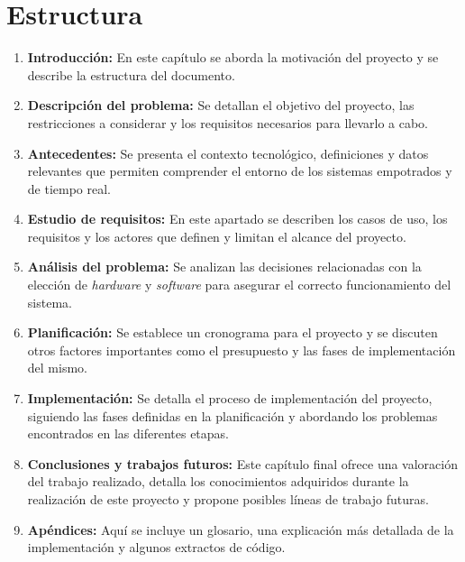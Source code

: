 \section{Estructura}
\begin{enumerate}
    \item \textbf{Introducción:} En este capítulo se aborda la motivación del proyecto y se describe la estructura del documento.
    \item \textbf{Descripción del problema:} Se detallan el objetivo del proyecto, las restricciones a considerar y los requisitos necesarios para llevarlo a cabo.
    \item \textbf{Antecedentes:} Se presenta el contexto tecnológico, definiciones y datos relevantes que permiten comprender el entorno de los sistemas empotrados y de tiempo real.
    \item \textbf{Estudio de requisitos:} En este apartado se describen los casos de uso, los requisitos y los actores que definen y limitan el alcance del proyecto.
    \item \textbf{Análisis del problema:} Se analizan las decisiones relacionadas con la elección de \emph{hardware} y \emph{software} para asegurar el correcto funcionamiento del sistema.
    \item \textbf{Planificación:} Se establece un cronograma para el proyecto y se discuten otros factores importantes como el presupuesto y las fases de implementación del mismo.
    \item \textbf{Implementación:} Se detalla el proceso de implementación del proyecto, siguiendo las fases definidas en la planificación y abordando los problemas encontrados en las diferentes etapas.
    \item \textbf{Conclusiones y trabajos futuros:} Este capítulo final ofrece una valoración del trabajo realizado, detalla los conocimientos adquiridos durante la realización de este proyecto y propone posibles líneas de trabajo futuras.
    \item \textbf{Apéndices:} Aquí se incluye un glosario, una explicación más detallada de la implementación y algunos extractos de código.
\end{enumerate}
